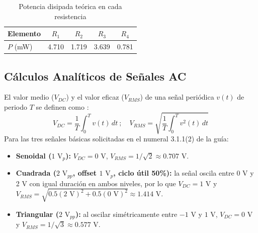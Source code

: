 \documentclass[journal, a4paper]{IEEEtran}
\begin{document}
\begin{table}[h]
\centering
\caption{Potencia disipada teórica en cada resistencia}
\label{tab:potencias}
\begin{tabular}{@{}lcccc@{}}
\toprule
\textbf{Elemento} & $R_1$ & $R_2$ & $R_3$ & $R_4$ \\ \midrule
$P$ (mW) & 4.710 & 1.719 & 3.639 & 0.781 \\ \bottomrule
\end{tabular}
\end{table}

\subsection{Cálculos Analíticos de Señales AC}
El valor medio ($V_{DC}$) y el valor eficaz ($V_{RMS}$) de una señal periódica $v(t)$ de periodo $T$ se definen como \cite{sedra2020}:
\begin{equation}
    V_{DC} = \frac{1}{T}\int_{0}^{T} v(t)\,dt \: ; \quad V_{RMS} = \sqrt{\frac{1}{T}\int_{0}^{T} v^2(t)\,dt}
\end{equation}
Para las tres señales básicas solicitadas en el numeral 3.1.1(2) de la guía:
\begin{itemize}
    \item \textbf{Senoidal ($1\text{ V}_p$):} $V_{DC} = 0\text{ V}$, $V_{RMS} = 1/\sqrt{2} \approx 0.707\text{ V}$.
    \item \textbf{Cuadrada ($2\text{ V}_{pp}$, offset $1\text{ V}_p$, ciclo útil 50\%):} la señal oscila entre 0 V y 2 V con igual duración en ambos niveles, por lo que $V_{DC} = 1\text{ V}$ y $V_{RMS} = \sqrt{0.5(2\text{ V})^2 + 0.5(0\text{ V})^2} \approx 1.414\text{ V}$.
    \item \textbf{Triangular ($2\text{ V}_{pp}$):} al oscilar simétricamente entre $-1\text{ V}$ y $1\text{ V}$, $V_{DC} = 0\text{ V}$ y $V_{RMS} = 1/\sqrt{3} \approx 0.577\text{ V}$.
\end{itemize}
\end{document}
